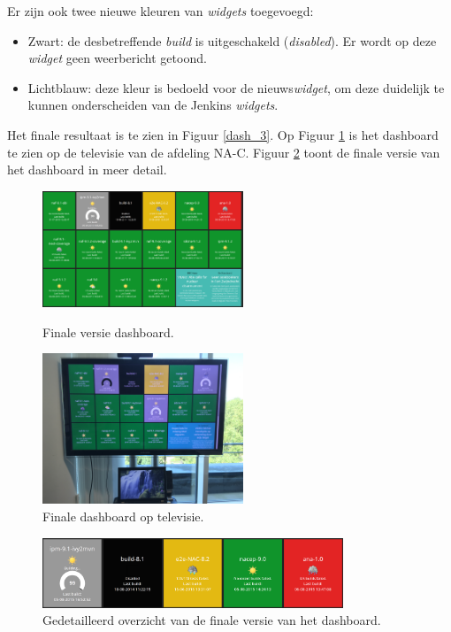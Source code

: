 \documentclass[10pt,a4paper]{article}
\begin{document}
Er zijn ook twee nieuwe kleuren van \textit{widgets} toegevoegd:
\begin{itemize}
\item Zwart: de desbetreffende \textit{build} is uitgeschakeld (\textit{disabled}). Er wordt op deze \textit{widget} geen weerbericht getoond.
\item Lichtblauw: deze kleur is bedoeld voor de nieuws\textit{widget}, om deze duidelijk te kunnen onderscheiden van de Jenkins \textit{widgets}.
\end{itemize}

Het finale resultaat is te zien in Figuur \ref{dash_3}. Op Figuur \ref{dash_4} is het dashboard te zien op de televisie van de afdeling NA-C. Figuur \ref{dash_5} toont de finale versie van het dashboard in meer detail.

\begin{figure}
\centering
\begin{minipage}{0.45\textwidth}
\centering
\includegraphics[width=60mm]{dashboard_screenshot4.png}
\caption{Finale versie dashboard.}
\label{dash_3}
\end{minipage}\hfill
\begin{minipage}{0.45\textwidth}
\centering
\includegraphics[width=60mm]{dashboardresult.jpg}
\caption{Finale dashboard op televisie.}
\label{dash_4}
\end{minipage}
\end{figure}

\begin{figure}[ht!]
\centering
\includegraphics[width=90mm]{dashboard_screenshot5.png}
\caption{Gedetailleerd overzicht van de finale versie van het dashboard.} 
\label{dash_5}
\end{figure}
\end{document}
